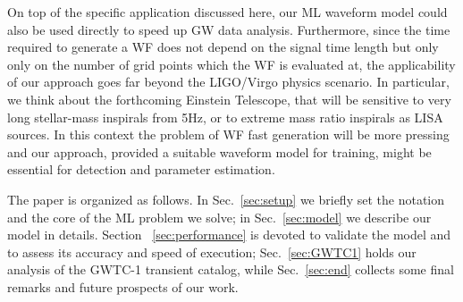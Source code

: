 %
On top of the specific application discussed here, our ML waveform model could also be used directly 
to speed up GW data analysis.
Furthermore, since the time required to generate a WF does not depend
on the signal time length but only only on the number of grid points which the WF is evaluated at,
the applicability of our approach goes far beyond the LIGO/Virgo physics scenario. In particular,
we think about the forthcoming Einstein Telescope, that will be sensitive to very long stellar-mass 
inspirals from 5Hz, or to extreme mass ratio inspirals as LISA sources. In this context the problem
of WF fast generation will be more pressing and our approach, provided a suitable waveform model 
for training,  might be essential for detection and parameter estimation. 

The paper is organized as follows. In Sec.~\ref{sec:setup} we briefly set the 
notation and the core of the ML problem we solve; in Sec.~\ref{sec:model} we describe 
our model in details. Section ~\ref{sec:performance} is devoted to validate the model 
and to assess its accuracy and speed of execution; Sec.~\ref{sec:GWTC1} holds 
our analysis of the GWTC-1 transient catalog, while  Sec.~\ref{sec:end} collects 
some final remarks and future prospects of our work.

